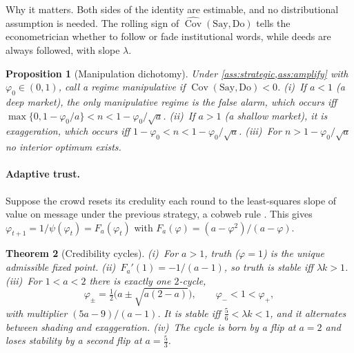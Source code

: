 \documentclass{article}
\theoremstyle{plain}
\newtheorem{theorem}{Theorem}[section]
\newtheorem{proposition}[theorem]{Proposition}
\theoremstyle{definition}
\theoremstyle{remark}
\DeclareMathOperator{\Cov}{Cov}
\begin{document}
\begin{takeaway}{Why it matters.}
Both sides of the identity are estimable, and no distributional assumption is needed. The rolling sign of $\widehat{\Cov}(\text{Say},\text{Do})$ tells the econometrician whether to follow or fade institutional words, while deeds are always followed, with slope $\lambda$.
\end{takeaway}

\begin{proposition}[Manipulation dichotomy]\label{prop:virality}
Under \cref{ass:strategic,ass:amplify} with $\varphi_0\in(0,1)$, call a regime manipulative if $\Cov(\text{Say},\text{Do})<0$. \textup{(i)}~If $a<1$ (a deep market), the only manipulative regime is the false alarm, which occurs iff $\max\{0,1-\varphi_0/a\}<n<1-\varphi_0/\sqrt a$. \textup{(ii)}~If $a>1$ (a shallow market), it is exaggeration, which occurs iff $1-\varphi_0<n<1-\varphi_0/\sqrt a$. \textup{(iii)}~For $n>1-\varphi_0/\sqrt a$ no interior optimum exists.
\end{proposition}

\paragraph{Adaptive trust.} Suppose the crowd resets its credulity each round to the least-squares slope of value on message under the previous strategy, a cobweb rule \citep{ezekiel1938,evans2001}. This gives $\varphi_{t+1}=1/\psi(\varphi_t)=F_a(\varphi_t)$ with $F_a(\varphi)=(a-\varphi^2)/(a-\varphi)$.

\begin{theorem}[Credibility cycles]\label{thm:cycles}
\textup{(i)}~For $a>1$, truth ($\varphi=1$) is the unique admissible fixed point. \textup{(ii)}~$F_a'(1)=-1/(a-1)$, so truth is stable iff $\lambda k>1$. \textup{(iii)}~For $1<a<2$ there is exactly one $2$-cycle,
\[
  \varphi_\pm=\tfrac12\big(a\pm\sqrt{a(2-a)}\big),\qquad \varphi_-<1<\varphi_+,
\]
with multiplier $(5a-9)/(a-1)$. It is stable iff $\tfrac56<\lambda k<1$, and it alternates between shading and exaggeration. \textup{(iv)}~The cycle is born by a flip at $a=2$ and loses stability by a second flip at $a=\tfrac53$.
\end{theorem}
\end{document}
